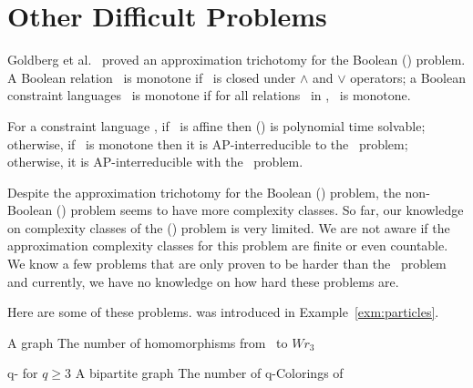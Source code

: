 \section{Other Difficult Problems}
Goldberg et al.~\cite{Trichotomy} proved an approximation trichotomy for the Boolean
\ccsp(\mrelset) problem. A Boolean relation \mR\ is monotone if \mR\ is closed under
\(\land\) and \(\lor\) operators; a Boolean constraint languages \mrelset\ is monotone if 
for all relations \mR\ in \mrelset, \mR\ is monotone.


\begin{theorem}
For a constraint language \mrelset,
if \mrelset\ is affine then \ccsp(\mrelset) is polynomial time solvable; otherwise,
if \mrelset\ is monotone then it is AP-interreducible to the \cbis\ problem; otherwise,
it is AP-interreducible with the \csat\ problem.
\end{theorem}

Despite the approximation trichotomy for the Boolean \ccsp(\mrelset) problem,
the non-Boolean \ccsp(\mrelset) problem seems to have more complexity classes.
So far, our knowledge on complexity classes of the \ccsp(\mrelset) problem 
is very limited. We are not aware if the approximation
complexity classes for this problem are finite or even countable.
We know a few problems that are only proven to be harder than
the \cbis\ problem \cite{Leslie03} and currently, 
we have no knowledge on how hard these problems are.

Here are some of these problems.  was introduced in
Example~\ref{exm:particles}.

{A graph \mG}
{The number of homomorphisms from \mG\ to \(Wr_3\)}

\pdef
{ q- for \(q\ge 3\)}
{A bipartite graph \mG}
{The number of q-Colorings of \mG}
